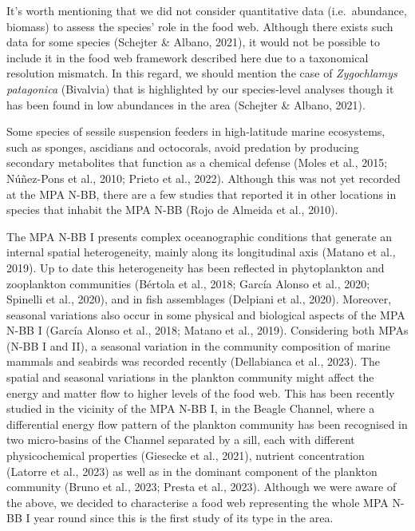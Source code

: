 \documentclass[preprint, 3p,
authoryear]{elsarticle} %
\begin{document}
It's worth mentioning that we did not consider quantitative data
(i.e.~abundance, biomass) to assess the species' role in the food web.
Although there exists such data for some species (Schejter \& Albano,
2021), it would not be possible to include it in the food web framework
described here due to a taxonomical resolution mismatch. In this regard,
we should mention the case of \emph{Zygochlamys patagonica} (Bivalvia)
that is highlighted by our species-level analyses though it has been
found in low abundances in the area (Schejter \& Albano, 2021).

Some species of sessile suspension feeders in high-latitude marine
ecosystems, such as sponges, ascidians and octocorals, avoid predation
by producing secondary metabolites that function as a chemical defense
(Moles et al., 2015; Núñez-Pons et al., 2010; Prieto et al., 2022).
Although this was not yet recorded at the MPA N-BB, there are a few
studies that reported it in other locations in species that inhabit the
MPA N-BB (Rojo de Almeida et al., 2010).

The MPA N-BB I presents complex oceanographic conditions that generate
an internal spatial heterogeneity, mainly along its longitudinal axis
(Matano et al., 2019). Up to date this heterogeneity has been reflected
in phytoplankton and zooplankton communities (Bértola et al., 2018;
García Alonso et al., 2020; Spinelli et al., 2020), and in fish
assemblages (Delpiani et al., 2020). Moreover, seasonal variations also
occur in some physical and biological aspects of the MPA N-BB I (García
Alonso et al., 2018; Matano et al., 2019). Considering both MPAs (N-BB I
and II), a seasonal variation in the community composition of marine
mammals and seabirds was recorded recently (Dellabianca et al., 2023).
The spatial and seasonal variations in the plankton community might
affect the energy and matter flow to higher levels of the food web. This
has been recently studied in the vicinity of the MPA N-BB I, in the
Beagle Channel, where a differential energy flow pattern of the plankton
community has been recognised in two micro-basins of the Channel
separated by a sill, each with different physicochemical properties
(Giesecke et al., 2021), nutrient concentration (Latorre et al., 2023)
as well as in the dominant component of the plankton community (Bruno et
al., 2023; Presta et al., 2023). Although we were aware of the above, we
decided to characterise a food web representing the whole MPA N-BB I
year round since this is the first study of its type in the area.
\end{document}
